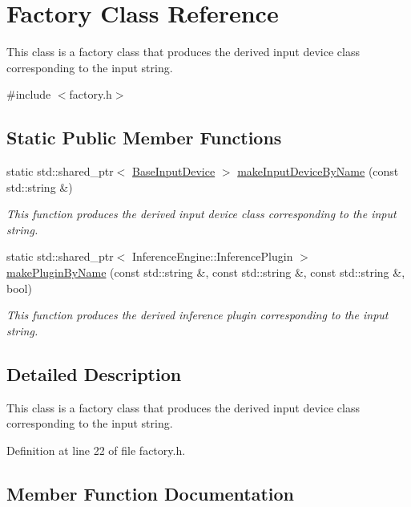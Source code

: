 \hypertarget{classFactory}{}\section{Factory Class Reference}
\label{classFactory}


This class is a factory class that produces the derived input device class corresponding to the input string.  




{\ttfamily \#include $<$factory.\+h$>$}

\subsection*{Static Public Member Functions}
\begin{DoxyCompactItemize}
\item 
static std\+::shared\+\_\+ptr$<$ \hyperlink{classBaseInputDevice}{Base\+Input\+Device} $>$ \hyperlink{classFactory_a36585401f9a09c2d1c381546a501ea94}{make\+Input\+Device\+By\+Name} (const std\+::string \&)
\begin{DoxyCompactList}\small\item\em This function produces the derived input device class corresponding to the input string. \end{DoxyCompactList}\item 
static std\+::shared\+\_\+ptr$<$ Inference\+Engine\+::\+Inference\+Plugin $>$ \hyperlink{classFactory_a4c3731eeb49aa60626dad92f4b2cbc0d}{make\+Plugin\+By\+Name} (const std\+::string \&, const std\+::string \&, const std\+::string \&, bool)
\begin{DoxyCompactList}\small\item\em This function produces the derived inference plugin corresponding to the input string. \end{DoxyCompactList}\end{DoxyCompactItemize}


\subsection{Detailed Description}
This class is a factory class that produces the derived input device class corresponding to the input string. 

Definition at line 22 of file factory.\+h.



\subsection{Member Function Documentation}
